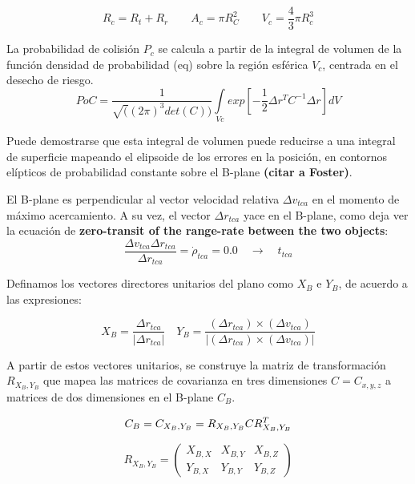 \begin{equation}
R_{c}=R_{t}+R_{r} \qquad A_{c}=\pi R_{C}^{2} \qquad V_{c}=\frac{4}{3} \pi R_{c}^{3}
\end{equation}

La probabilidad de colisi\'on $P_{c}$ se calcula a partir de la integral de volumen de la funci\'on densidad de probabilidad (eq) sobre la regi\'on esf\'erica $V_{c}$, centrada en el desecho de riesgo.
\begin{equation}
PoC=\frac{1}{\sqrt((2\pi)^3det(C))} \int \limits_{Vc} exp[-\frac{1}{2}\Delta r^TC^{-1}\Delta r]dV
\label{eq:poc3d}
\end{equation}

Puede demostrarse que esta integral de volumen puede reducirse a una integral de superficie mapeando el elipsoide  de los errores en la posici\'on, en contornos el\'ipticos de probabilidad constante sobre el B-plane {\bf{(citar a Foster)}}.

El B-plane es perpendicular al vector velocidad relativa $\Delta v_{tca}$ en el momento de m\'aximo acercamiento.
A su vez, el vector $\Delta r_{tca}$ yace en el B-plane, como deja ver la ecuaci\'on de {\bf{zero-transit of the range-rate between the two objects}}:
\begin{equation}
 \frac{\Delta v_{tca} \Delta r_{tca}}{\Delta r_{tca}}= \dot{\rho}_{tca}=0.0 \quad \rightarrow \quad t_{tca}
\end{equation}

Definamos los vectores directores unitarios del plano como $X_{B}$ e $Y_{B}$, de acuerdo a las expresiones:

\begin{equation}
 X_{B}=\frac{\Delta r_{tca}}{|\Delta r_{tca}|} \quad Y_{B}=\frac{(\Delta r_{tca}) \times (\Delta v_{tca})}{|(\Delta r_{tca}) \times (\Delta v_{tca})|}
\end{equation}


A partir de estos vectores unitarios, se construye la matriz de transformaci\'on $R_{X_{B},Y_{B}}$ que mapea las matrices de covarianza en tres dimensiones $C=C_{x,y,z}$ a matrices de dos dimensiones en el B-plane $C_{B}$.

\begin{equation}
  C_{B} = C_{{X_{B},Y_{B}}} = R_{X_{B},Y_{B}} C R^{T}_{X_{B},Y_{B}}\\
\end{equation}

\begin{equation}
  R_{X_{B},Y_{B}} = 
  \begin{pmatrix}
    X_{B,X} & X_{B,Y} & X_{B,Z}\\
    Y_{B,X} & Y_{B,Y} & Y_{B,Z}
  \end{pmatrix}
\end{equation}

